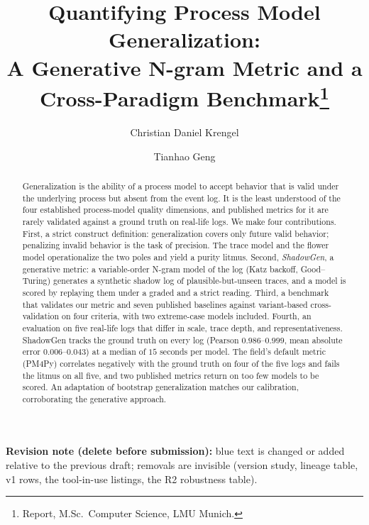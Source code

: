 \documentclass[runningheads]{llncs}
\newcommand{\chg}[1]{\textcolor{chgblue}{#1}}
\begin{document}
\title{Quantifying Process Model Generalization:\\
A Generative N-gram Metric and a Cross-Paradigm Benchmark\thanks{Report, M.Sc.\ Computer Science, LMU Munich.}}

\author{Christian Daniel Krengel \and Tianhao Geng}

\maketitle

{\color{chgblue}\noindent\footnotesize\textbf{Revision note (delete before submission):} blue text is changed or added relative to the previous draft; removals are invisible (version study, lineage table, v1 rows, the tool-in-use listings, the R2 robustness table).\par}\vspace{2mm}

\begin{abstract}
Generalization is the ability of a process model to accept behavior that is valid under the underlying process but absent from the event log. It is the least understood of the four established process-model quality dimensions, \chg{and published metrics for it are rarely validated against a ground truth on real-life logs. We make four contributions. First, a strict construct definition: generalization covers only future valid behavior; penalizing invalid behavior is the task of precision. The trace model and the flower model operationalize the two poles and yield a purity litmus. Second, \emph{ShadowGen}, a generative metric: a variable-order N-gram model of the log (Katz backoff, Good--Turing) generates a synthetic shadow log of plausible-but-unseen traces, and a model is scored by replaying them under a graded and a strict reading. Third, a benchmark that validates our metric and seven published baselines against variant-based cross-validation on four criteria, with two extreme-case models included. Fourth, an evaluation on five real-life logs that differ in scale, trace depth, and representativeness. ShadowGen tracks the ground truth on every log (Pearson $0.986$--$0.999$, mean absolute error $0.006$--$0.043$) at a median of $15$ seconds per model. The field's default metric (PM4Py) correlates negatively with the ground truth on four of the five logs and fails the litmus on all five, and two published metrics return on too few models to be scored. An adaptation of bootstrap generalization matches our calibration, corroborating the generative approach.}

\end{abstract}
\end{document}
